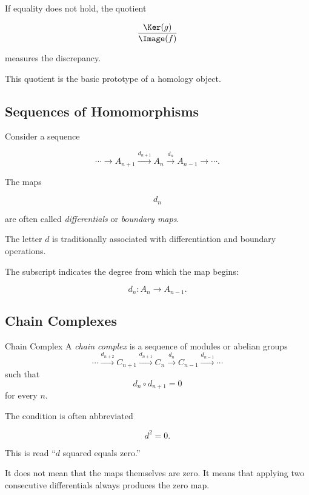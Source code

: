 If equality does not hold, the quotient

\[ \frac{\Ker(g)}{\Image(f)} \]

measures the discrepancy.

This quotient is the basic prototype of a homology object.

\subsection{Sequences of Homomorphisms}
\label{subsec:sequences-homomorphisms}

Consider a sequence

\[ \cdots\longrightarrow A_{n+1}
\xrightarrow{d_{n+1}}A_n
\xrightarrow{d_n}A_{n-1}
\longrightarrow\cdots. \]

The maps

\[ d_n \]

are often called \emph{differentials} or \emph{boundary maps}.

The letter \(d\) is traditionally associated with differentiation and
boundary operations.

The subscript indicates the degree from which the map begins:

\[ d_n:A_n\to A_{n-1}. \]

\subsection{Chain Complexes}
\label{subsec:chain-complexes}

\begin{definitionbox}{Chain Complex}
A \emph{chain complex} is a sequence of modules or abelian groups
\[ \cdots\xrightarrow{d_{n+2}}C_{n+1}
\xrightarrow{d_{n+1}}C_n
\xrightarrow{d_n}C_{n-1}
\xrightarrow{d_{n-1}}\cdots \]
such that
\[ d_n\circ d_{n+1}=0 \]
for every \(n\).
\end{definitionbox}

The condition is often abbreviated

\[ d^2=0. \]

This is read ``\(d\) squared equals zero.''

It does not mean that the maps themselves are zero. It means that applying
two consecutive differentials always produces the zero map.

